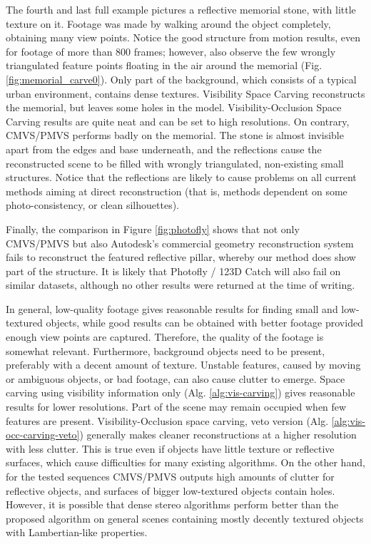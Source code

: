 The fourth and last full example pictures a reflective memorial stone, with little texture on it. Footage was made by walking around the object completely, obtaining many view points. Notice the good structure from motion results, even for footage of more than 800 frames; however, also observe the few wrongly triangulated feature points floating in the air around the memorial (Fig. \ref{fig:memorial_carve0}). Only part of the background, which consists of a typical urban environment, contains dense textures. Visibility Space Carving reconstructs the memorial, but leaves some holes in the model. Visibility-Occlusion Space Carving results are quite neat and can be set to high resolutions. On contrary, CMVS/PMVS performs badly on the memorial. The stone is almost invisible apart from the edges and base underneath, and the reflections cause the reconstructed scene to be filled with wrongly triangulated, non-existing small structures. Notice that the reflections are likely to cause problems on all current methods aiming at direct reconstruction (that is, methods dependent on some photo-consistency, or clean silhouettes).

Finally, the comparison in Figure \ref{fig:photofly} shows that not only CMVS/PMVS but also Autodesk's commercial geometry reconstruction system fails to reconstruct the featured reflective pillar, whereby our method does show part of the structure. It is likely that Photofly / 123D Catch will also fail on similar datasets, although no other results were returned at the time of writing.

In general, low-quality footage gives reasonable results for finding small and low-textured objects, while good results can be obtained with better footage provided enough view points are captured. Therefore, the quality of the footage is somewhat relevant. Furthermore, background objects need to be present, preferably with a decent amount of texture. Unstable features, caused by moving or ambiguous objects, or bad footage, can also cause clutter to emerge. Space carving using visibility information only (Alg. \ref{alg:vis-carving}) gives reasonable results for lower resolutions. Part of the scene may remain occupied when few features are present. Visibility-Occlusion space carving, veto version (Alg. \ref{alg:vis-occ-carving-veto}) generally makes cleaner reconstructions at a higher resolution with less clutter. This is true even if objects have little texture or reflective surfaces, which cause difficulties for many existing algorithms. On the other hand, for the tested sequences CMVS/PMVS outputs high amounts of clutter for reflective objects, and surfaces of bigger low-textured objects contain holes. However, it is possible that dense stereo algorithms perform better than the proposed algorithm on general scenes containing mostly decently textured objects with Lambertian-like properties.

